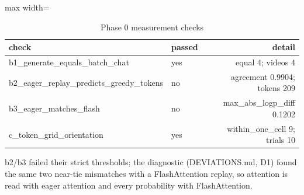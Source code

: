 \begin{table}[htbp]
\centering
\scriptsize
\caption{Phase 0 measurement checks}\label{tab:R1}
\begin{adjustbox}{max width=\textwidth}
\begin{tabular}{llr}
\toprule
check & passed & detail \\
\midrule
b1\_generate\_equals\_batch\_chat & yes & equal 4; videos 4 \\
b2\_eager\_replay\_predicts\_greedy\_tokens & no & agreement 0.9904; tokens 209 \\
b3\_eager\_matches\_flash & no & max\_abs\_logp\_diff 0.1202 \\
c\_token\_grid\_orientation & yes & within\_one\_cell 9; trials 10 \\
\bottomrule
\end{tabular}
\end{adjustbox}
\par\smallskip\parbox{\textwidth}{\footnotesize b2/b3 failed their strict thresholds; the diagnostic (DEVIATIONS.md, D1) found the same two near-tie mismatches with a FlashAttention replay, so attention is read with eager attention and every probability with FlashAttention.}
\end{table}
